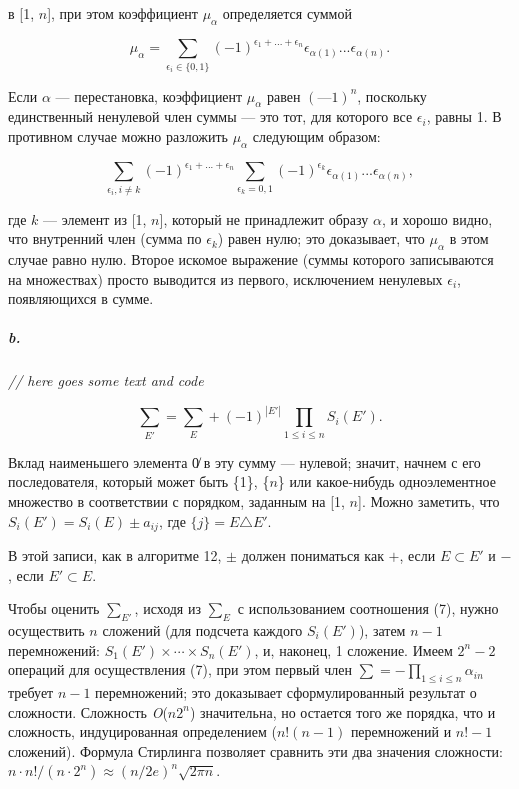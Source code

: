 \documentclass{../../template/mai_book}
\begin{document}

\noindent
[1, $n$] в [1, $n$], при этом коэффициент $\mu_\alpha$ определяется суммой

\begin{equation*}
\mu_{\alpha} = \sum_{\epsilon_i\in\{0,1\}} (-1)^{\epsilon_1+...+\epsilon_n} \epsilon_{\alpha(1)}...\epsilon_{\alpha(n)}.
\end{equation*}

\noindent
Если $\alpha$ — перестановка, коэффициент $\mu_\alpha$ равен $(—1)^n$, поскольку единственный ненулевой член суммы — это тот, для которого все $\epsilon_i$, равны 1. В противном случае можно разложить $\mu_\alpha$ следующим образом:

\begin{equation*}
\sum_{\epsilon_i, i \neq k} (-1)^{\epsilon_1+...+\epsilon_n} \sum_{\epsilon_k=0,1} (-1)^{\epsilon_k} \epsilon_{\alpha(1)}...\epsilon_{\alpha(n)},
\end{equation*}

\noindent
где $k$ — элемент из [1, $n$], который не принадлежит образу $\alpha$, и хорошо видно, что внутренний член (сумма по $\epsilon_k$) равен нулю; это доказывает, что $\mu_\alpha$ в этом случае равно нулю. Второе искомое выражение (суммы которого записываются на множествах) просто выводится из первого, исключением ненулевых $\epsilon_i$, появляющихся в сумме.

\subparagraph{b.} \textit{// here goes some text and code}

\setcounter{equation}{6}

\begin{equation}
{\sum}_{E'} = {\sum}_E + (-1)^{|E'|} \prod_{1 \leq i \leq n} S_i(E').
\end{equation}

\noindent
Вклад наименьшего элемента 0̸  в эту сумму — нулевой; значит, начнем с его последователя, который может быть \{1\}, \{$n$\} или какое-нибудь одноэлементное множество в соответствии с порядком, заданным на [1, $n$]. Можно заметить, что $S_i(E') = S_i(E) \pm a_{ij}$, где $\{j\} = E \triangle E'$.

\pagebreak


\noindent
В этой записи, как в алгоритме 12, $\pm$ должен пониматься как $+$, если $E \subset E'$ и $-$, если $E' \subset E$.

Чтобы оценить ${\sum}_{E'}$, исходя из ${\sum}_E$ с использованием 
соотношения (7), нужно осуществить $n$ сложений (для подсчета каждого $S_i (E')$), затем $n - 1$ перемножений: $S_1(E') \times \cdots \times S_n(E')$, и, наконец, 1 сложение. Имеем $2^n - 2$ операций для осуществления (7), при этом первый член $\sum = -{\prod}_{1 \leq i \leq n} \alpha_{in}$ требует $n - 1$ перемножений; это доказывает сформулированный результат о сложности. Сложность \textit{O}($n2^n$) значительна, но остается того же порядка, что и сложность, индуцированная определением ($n!(n - 1)$ перемножений и $n! - 1$ сложений). Формула Стирлинга позволяет сравнить эти два значения сложности: $ n \cdot n!/(n \cdot 2^n) \approx (n/2e)^n \sqrt{2\pi n}$.
\end{document}
